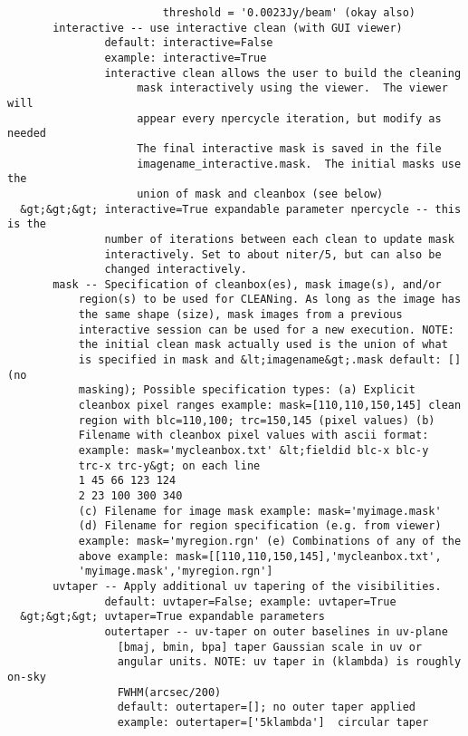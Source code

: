 \begin{verbatim}
                        threshold = '0.0023Jy/beam' (okay also)
       interactive -- use interactive clean (with GUI viewer)
               default: interactive=False
               example: interactive=True
               interactive clean allows the user to build the cleaning
                    mask interactively using the viewer.  The viewer will
                    appear every npercycle iteration, but modify as needed
                    The final interactive mask is saved in the file
                    imagename_interactive.mask.  The initial masks use the
                    union of mask and cleanbox (see below)
  &gt;&gt;&gt; interactive=True expandable parameter npercycle -- this is the
               number of iterations between each clean to update mask
               interactively. Set to about niter/5, but can also be
               changed interactively.
       mask -- Specification of cleanbox(es), mask image(s), and/or
           region(s) to be used for CLEANing. As long as the image has
           the same shape (size), mask images from a previous
           interactive session can be used for a new execution. NOTE:
           the initial clean mask actually used is the union of what
           is specified in mask and &lt;imagename&gt;.mask default: [] (no
           masking); Possible specification types: (a) Explicit
           cleanbox pixel ranges example: mask=[110,110,150,145] clean
           region with blc=110,100; trc=150,145 (pixel values) (b)
           Filename with cleanbox pixel values with ascii format:
           example: mask='mycleanbox.txt' &lt;fieldid blc-x blc-y
           trc-x trc-y&gt; on each line 
           1 45 66 123 124 
           2 23 100 300 340
           (c) Filename for image mask example: mask='myimage.mask'
           (d) Filename for region specification (e.g. from viewer)
           example: mask='myregion.rgn' (e) Combinations of any of the
           above example: mask=[[110,110,150,145],'mycleanbox.txt',
           'myimage.mask','myregion.rgn']
       uvtaper -- Apply additional uv tapering of the visibilities.
               default: uvtaper=False; example: uvtaper=True
  &gt;&gt;&gt; uvtaper=True expandable parameters
               outertaper -- uv-taper on outer baselines in uv-plane
                 [bmaj, bmin, bpa] taper Gaussian scale in uv or 
                 angular units. NOTE: uv taper in (klambda) is roughly on-sky 
                 FWHM(arcsec/200)
                 default: outertaper=[]; no outer taper applied
                 example: outertaper=['5klambda']  circular taper 

\end{verbatim}
